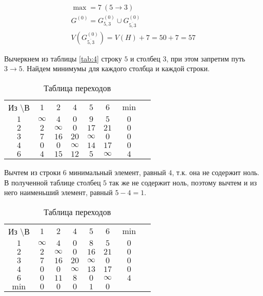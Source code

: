 \begin{gather*}
\max = 7\ (5 \rightarrow 3) \\
G^{(0)} = G_{5,3}^{(0)} \cup G_{\overline{5,3}}^{(0)} \\
V(G_{\overline{5,3}}^{(0)}) = V(H) + 7 = 50 + 7 = 57
\end{gather*}

Вычеркнем из таблицы  \ref{tab:4} строку $5$ и столбец $3$, при этом запретим путь $3 \rightarrow 5$. Найдем минимумы для каждого столбца и каждой строки.

\begin{table}[H]
\begin{center}
	\def\tabcolsep{15pt}
	\caption{Таблица переходов}
	\label{tab:6}
	\begin{tabular}{|c||c|c|c|c|c|c|c|}
		\hline
		Из \textbackslash В & $1$ & $2$ & $4$ & $5$ & $6$ & $\min$ \\
		\hhline{|=#=|=|=|=|=|=|}
		$1$ & $\infty$ & $4$ & $0$ & $9$ & $5$ & $0$ \\
		\hline
		$2$ & $2$ & $\infty$ & $0$ & $17$ & $21$ & $0$ \\
		\hline
		$3$ & $7$ & $16$ & $20$ & $\infty$ & $0$ & $0$ \\ 
		\hline
		$4$ & $0$ & $0$ & $\infty$ & $14$ & $17$ & $0$ \\
		\hline
		$6$ & $4$ & $15$ & $12$ & $5$ & $\infty$ & $4$ \\
		\hline
	\end{tabular}
\end{center}
\end{table}

Вычтем из строки $6$ минимальный элемент, равный $4$, т.к. она не содержит ноль. В полученной таблице столбец $5$ так же не содержит ноль, поэтому вычтем и из него наименьший элемент, равный $5-4 = 1$.

\begin{table}[H]
\begin{center}
	\def\tabcolsep{15pt}
	\caption{Таблица переходов}
	\label{tab:7}
	\begin{tabular}{|c||c|c|c|c|c|c|c|}
		\hline
		Из \textbackslash В & $1$ & $2$ & $4$ & $5$ & $6$ & $\min$ \\
		\hhline{|=#=|=|=|=|=|=|}
		$1$ & $\infty$ & $4$ & $0$ & $8$ & $5$ & $0$ \\
		\hline
		$2$ & $2$ & $\infty$ & $0$ & $16$ & $21$ & $0$ \\
		\hline
		$3$ & $7$ & $16$ & $20$ & $\infty$ & $0$ & $0$ \\ 
		\hline
		$4$ & $0$ & $0$ & $\infty$ & $13$ & $17$ & $0$ \\
		\hline
		$6$ & $0$ & $11$ & $8$ & $0$ & $\infty$ & $4$ \\
		\hhline{|=#=|=|=|=|=|=|} 
		$\min$ & $0$ & $0$ & $0$ & $1$ & $0$ & \\ 
		\hline
	\end{tabular}
\end{center}
\end{table}

